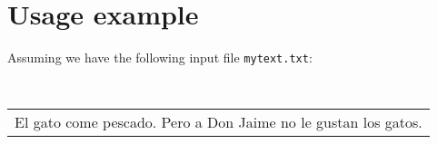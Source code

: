 \documentclass[a4paper]{book}
\begin{document}
%
%
%
%
%
%
%

\section{Usage example}

   Assuming we have the following input file {\tt mytext.txt}:
{\small {\tt 
\begin{center}
\begin{tabular}{p{6cm}}
El gato come pescado. Pero a Don Jaime no le gustan los gatos.
\end{tabular}
\end{center}
}}
\end{document}
